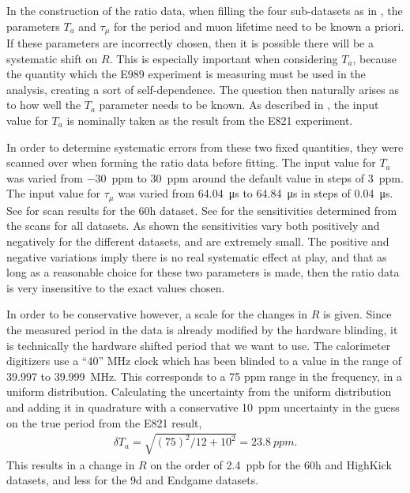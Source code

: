 In the construction of the ratio data, when filling the four sub-datasets as in , the parameters $T_{a}$ and $\tau_{\mu}$ for the \gmtwo period and muon lifetime need to be known a priori. If these parameters are incorrectly chosen, then it is possible there will be a systematic shift on $R$. This is especially important when considering $T_{a}$, because the quantity which the E989 experiment is measuring must be used in the analysis, creating a sort of self-dependence. The question then naturally arises as to how well the $T_{a}$ parameter needs to be known. As described in , the input value for $T_{a}$ is nominally taken as the result from the E821 experiment. 

In order to determine systematic errors from these two fixed quantities, they were scanned over when forming the ratio data before fitting. The input value for $T_{a}$ was varied from \SI{-30}{ppm} to \SI{+30}{ppm} around the default value in steps of \SI{3}{ppm}. The input value for $\tau_{\mu}$ was varied from \SI{64.04}{\micro s} to \SI{64.84}{\micro s} in steps of \SI{0.04}{\micro s}. See  for scan results for the 60h dataset. See  for the sensitivities determined from the scans for all datasets. As shown the sensitivities vary both positively and negatively for the different datasets, and are extremely small. The positive and negative variations imply there is no real systematic effect at play, and that as long as a reasonable choice for these two parameters is made, then the ratio data is very insensitive to the exact values chosen. 

In order to be conservative however, a scale for the changes in $R$ is given. Since the measured \gmtwo period in the data is already modified by the hardware blinding, it is technically the hardware shifted \gmtwo period that we want to use. The calorimeter digitizers use a ``40'' MHz clock which has been blinded to a value in the range of 39.997 to \SI{39.999}{MHz}\cite{ClockManual}. This corresponds to a 75 ppm range in the frequency, in a uniform distribution. Calculating the uncertainty from the uniform distribution and adding it in quadrature with a conservative \SI{10}{ppm} uncertainty in the guess on the true \gmtwo period from the E821 result, 
            \begin{align}
                \delta T_{a} = \sqrt{(75)^{2}/12 + 10^{2}} = \SI{23.8}{ppm}.
            \end{align}
This results in a change in $R$ on the order of \SI{2.4}{ppb} for the 60h and HighKick datasets, and less for the 9d and Endgame datasets. 

